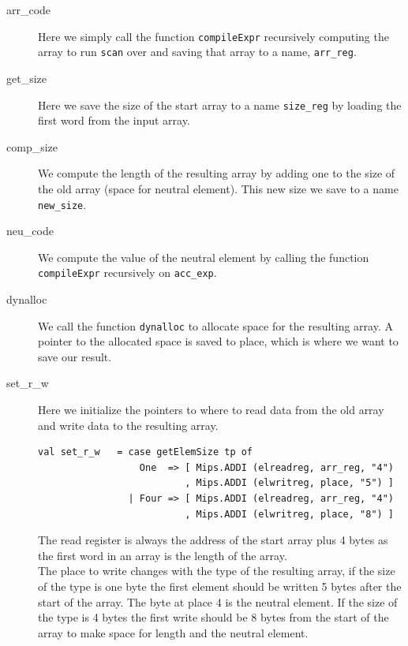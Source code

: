\documentclass[11pt]{article}
\begin{document}
    \begin{description}
        \item [arr\_code] Here we simply call the function \texttt{compileExpr}
            recursively computing the array to run \texttt{scan} over and saving
            that array to a name, \texttt{arr\_reg}.

        \item [get\_size] Here we save the size of the start array to a name
            \texttt{size\_reg} by loading the first word from the input array.

        \item [comp\_size] We compute the length of the resulting array by
            adding one to the size of the old array (space for neutral element).
            This new size we save to a name \texttt{new\_size}.

        \item [neu\_code] We compute the value of the neutral element by calling
            the function \texttt{compileExpr} recursively on \texttt{acc\_exp}.

        \item [dynalloc] We call the function \texttt{dynalloc} to allocate
            space for the resulting array.  A pointer to the allocated space is
            saved to place, which is where we want to save our result.

        \item [set\_r\_w] Here we initialize the pointers to where to read data
            from the old array and write data to the resulting array.

            \begin{lstlisting}
val set_r_w   = case getElemSize tp of
                  One  => [ Mips.ADDI (elreadreg, arr_reg, "4")
                          , Mips.ADDI (elwritreg, place, "5") ]
                | Four => [ Mips.ADDI (elreadreg, arr_reg, "4")
                          , Mips.ADDI (elwritreg, place, "8") ]
            \end{lstlisting}

            The read register is always the address of the start array plus 4
            bytes as the first word in an array is the length of the array. \\

            The place to write changes with the type of the resulting array, if
            the size of the type is one byte the first element should be written
            5 bytes after the start of the array.  The byte at place 4 is the
            neutral element.  If the size of the type is 4 bytes the first write
            should be 8 bytes from the start of the array to make space for
            length and the neutral element.


\end{description}
\end{document}
